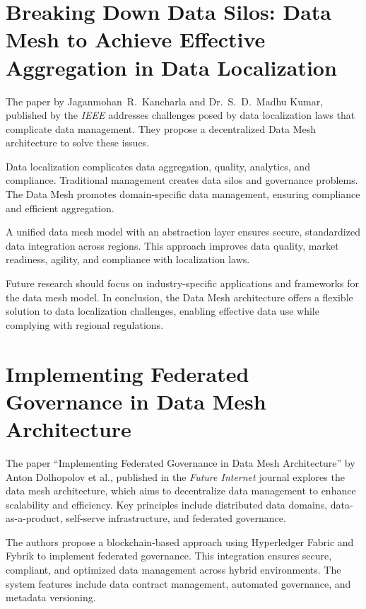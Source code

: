 \section{Breaking Down Data Silos: Data Mesh to Achieve Effective Aggregation in Data Localization}\label{sec:breaking-down-data-silos:-data-mesh-to-achieve-effective-aggregation-in-data-localization}

The paper by Jaganmohan~R.~Kancharla and Dr.~S.~D.~Madhu Kumar, published by the \textit{IEEE} addresses challenges posed by data localization laws that complicate data management\cite{breaking_down_data_silos}.
They propose a decentralized Data Mesh architecture to solve these issues.

Data localization complicates data aggregation, quality, analytics, and compliance.
Traditional management creates data silos and governance problems.
The Data Mesh promotes domain-specific data management, ensuring compliance and efficient aggregation.

A unified data mesh model with an abstraction layer ensures secure, standardized data integration across regions.
This approach improves data quality, market readiness, agility, and compliance with localization laws.

Future research should focus on industry-specific applications and frameworks for the data mesh model.
In conclusion, the Data Mesh architecture offers a flexible solution to data localization challenges, enabling effective data use while complying with regional regulations.

\section{Implementing Federated Governance in Data Mesh Architecture}\label{sec:implementing-federated-governance-in-data-mesh-architecture}

The paper ``Implementing Federated Governance in Data Mesh Architecture'' by Anton Dolhopolov et al., published in the \textit{Future Internet} journal explores the data mesh architecture, which aims to decentralize data management to enhance scalability and efficiency\cite{implementing_federated_governance}.
Key principles include distributed data domains, data-as-a-product, self-serve infrastructure, and federated governance.

The authors propose a blockchain-based approach using Hyperledger Fabric and Fybrik to implement federated governance. %
This integration ensures secure, compliant, and optimized data management across hybrid environments.
The system features include data contract management, automated governance, and metadata versioning.

